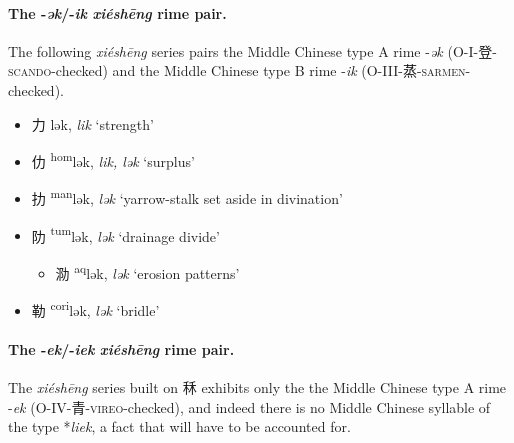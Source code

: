 \paragraph{The -\textit{ək}/-\textit{ik} \textit{xiéshēng} rime pair.}
\label{par:ək-ik-XS-pair}

The following \textit{xiéshēng} series pairs the Middle Chinese type A rime 
-\textit{ək} (O-I-登-\textsc{scando}-checked)
and the Middle Chinese type B
rime -\textit{ik}
(O-III-蒸-\textsc{sarmen}-checked). 


\begin{itemize}
    \item {\Large{力}} %
    {\large{lək}},
    \textit{lik} `strength' %

    \item {\Large{仂}} %
    {\large{{\textsuperscript{hom}}lək}},
    \textit{lik, lək} `surplus' %

    \item {\Large{扐}} %
    {\large{{\textsuperscript{man}}lək}},
    \textit{lək} `yarrow-stalk set aside in divination' %

    \item {\Large{阞}} %
    {\large{{\textsuperscript{tum}}lək}},
    \textit{lək} `drainage divide' %

\begin{itemize}
    \item {\Large{泐}} %
    {\large{{\textsuperscript{aq}}lək}},
    \textit{lək} `erosion patterns' %
\end{itemize}

    \item {\Large{勒}} %
    {\large{{\textsuperscript{cori}}lək}},
    \textit{lək} `bridle' %

  
\end{itemize}


\paragraph{The -\textit{ek}/-\textit{iek} \textit{xiéshēng} rime pair.}
\label{par:ek-iek-XS-pair}
The \textit{xiéshēng} series built on 秝 exhibits only the the Middle Chinese type A rime 
-\textit{ek} (O-IV-青-\textsc{vireo}-checked), and indeed there is no Middle Chinese syllable of the type *\textit{liek}, a fact that will have to be accounted for. 

